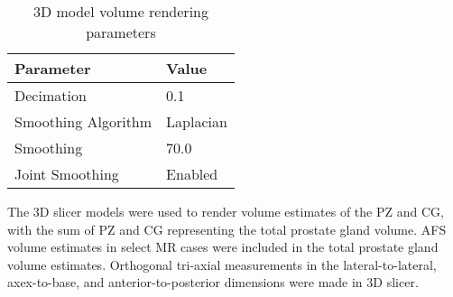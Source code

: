 \begin{table}[h!]
\centering
\caption{3D model volume rendering parameters}
\begin{tabular}{ll}
{\bf Parameter} & {\bf Value} \\ \hline
Decimation & 0.1 \\
Smoothing Algorithm & Laplacian \\
Smoothing  & 70.0 \\
Joint Smoothing & Enabled \\
\end{tabular}
\label{tab:3dslicer}
\end{table}

The 3D slicer models were used to render volume estimates of the PZ and CG,
with the sum of PZ and CG representing the total prostate gland volume.  AFS
volume estimates in select MR cases were included in the total prostate gland
volume estimates.  Orthogonal tri-axial measurements in the lateral-to-lateral,
axex-to-base, and anterior-to-posterior dimensions were made in 3D slicer.
